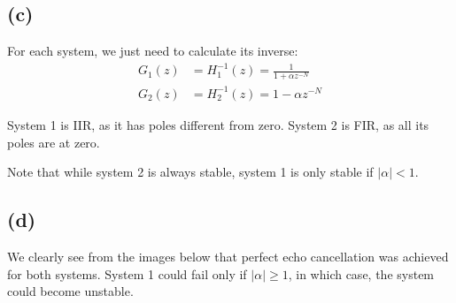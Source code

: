 \documentclass{article}
\begin{document}
\subsection{(c)}

For each system, we just need to calculate its inverse:
\begin{align}
G_1(z) &= H_1^{-1}(z) = \frac{1}{1 + \alpha z^{-N}} \tag{system 1} \\
G_2(z) &= H_2^{-1}(z) = 1 - \alpha z^{-N} \tag{system 2}
\end{align}

System 1 is IIR, as it has poles different from zero. System 2 is FIR, as all its poles are at zero. 

Note that while system 2 is always stable, system 1 is only stable if $|\alpha| < 1$. 

\subsection{(d)}

We clearly see from the images below that perfect echo cancellation was achieved for both systems. System 1 could fail only if $|\alpha| \geq 1$, in which case, the system could become unstable.
\end{document}
